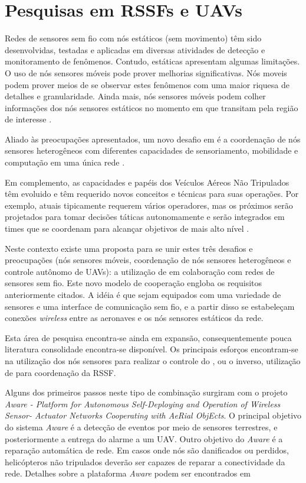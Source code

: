 \section{Pesquisas em RSSFs e UAVs}

Redes de sensores sem fio com nós estáticos (sem movimento) têm sido desenvolvidas, testadas e aplicadas em diversas atividades de detecção e monitoramento de fenômenos.
Contudo, \rssfs estáticas apresentam algumas limitações. O uso de nós sensores móveis pode prover melhorias significativas. Nós moveis podem prover meios de se observar estes fenômenos
com uma maior riquesa de detalhes e granularidade. Ainda mais, nós sensores móveis podem colher informações dos nós sensores estáticos no momento em que transitam
 pela região de interesse \cite{Aware}. 

Aliado às preocupações apresentados, um novo desafio em \rssfs é a coordenação de nós sensores heterogêneos com diferentes capacidades de sensoriamento, mobilidade e computação em uma única rede \cite{Freitas2009}. 

Em complemento, as capacidades e papéis dos Veículos Aéreos Não Tripulados têm evoluido e têm requerido novos conceitos e técnicas para suas operações. Por exemplo, \vants atuais tipicamente requerem vários operadores, mas os próximos \vants serão projetados para tomar decisões táticas autonomamente e serão integrados em times que se coordenam para alcançar objetivos de mais alto nível \cite{Richards2002, Mehdi2003}. 

Neste contexto existe uma proposta para se unir estes três desafios e preocupações (nós sensores móveis, coordenação de nós sensores heterogêneos e controle autônomo de UAVs): a utilização de \uavs em colaboração com redes de sensores sem fio. Este novo modelo de cooperação engloba os requisitos anteriormente citados. A idéia é que \vants sejam equipados com uma variedade de sensores e uma interface de comunicação sem fio, e a partir disso se estabeleçam conexões \emph{wireless} entre as aeronaves e os nós sensores estáticos da rede. 

Esta área de pesquisa encontra-se ainda em expansão, consequentemente pouca literatura consolidade encontra-se disponível. Os principais esforços encontram-se na utilização dos nós sensores para realizar o controle do \vant, ou o inverso, utilização de \vants para coordenação da RSSF.


Alguns dos primeiros passos neste tipo de combinação surgiram com o projeto \emph{Aware - Platform for Autonomous Self-Deploying and Operation of Wireless Sensor-
Actuator Networks Cooperating with AeRial ObjEcts}. O principal objetivo do sistema \emph{Aware} é a detecção de eventos por meio de sensores terrestres, e posteriormente a entrega do alarme a um UAV. Outro objetivo do \emph{Aware} é a reparação automática de rede. Em casos onde nós são danificados ou perdidos, helicópteros não tripulados deverão ser capazes de reparar a conectividade da rede. Detalhes sobre a plataforma \emph{Aware} podem ser encontrados em \cite{Aware, Aware2}



